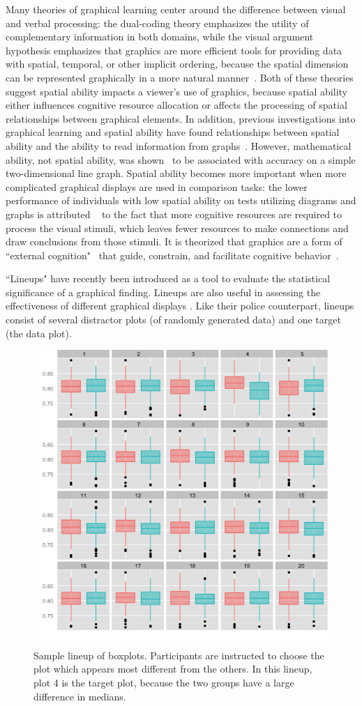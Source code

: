 \documentclass[11pt]{isuthesis}\usepackage[]{graphicx}\usepackage[]{color}
\begin{document}
Many theories of graphical learning center around the difference between visual and verbal processing: the dual-coding theory emphasizes the utility of complementary information in both domains, while the visual argument hypothesis emphasizes that graphics are more efficient tools for providing data with spatial, temporal, or other implicit ordering, because the spatial dimension can be represented graphically in a more natural manner~\citep{vekiri2002value}. Both of these theories suggest spatial ability impacts a viewer's use of graphics, because spatial ability either influences cognitive resource allocation or affects the processing of spatial relationships between graphical elements. In addition, previous investigations into graphical learning and spatial ability have found relationships between spatial ability and the ability to read information from graphs~\citep{lowrie2007solving}. 
However,  mathematical ability, not spatial ability, was shown~\citep{shah1995conceptual} to be associated with accuracy on a simple two-dimensional line graph. 
Spatial ability becomes more important when more complicated graphical displays are used in comparison tasks: the lower performance of individuals with low spatial ability on tests utilizing diagrams and graphs is attributed ~\citep{mayer1994whom} to the fact that more cognitive resources are required to process the visual stimuli, which leaves fewer resources to make connections and draw conclusions from those stimuli. It is theorized that graphics are a form of ``external cognition"~\citep{scaife1996external} that guide, constrain, and facilitate cognitive behavior~\citep{zhang1997nature}. 

``Lineups" have recently been introduced \citep{buja2009statistical, wickham2010graphical, majumder2013validation} as a tool to evaluate the statistical significance of a graphical finding. Lineups are also useful in assessing the effectiveness of different graphical displays \citep{hofmann2012graphical, loy:2015}. Like their police counterpart, lineups consist of several distractor plots (of randomly generated data) and one target (the data plot). 

\begin{figure}[htp]
\centering
\includegraphics[width=.5\linewidth]{lineup}
\caption[Sample lineup]{Sample lineup of boxplots. Participants are instructed to choose the plot which appears most different from the others. In this lineup, plot 4 is the target plot, because the two groups have a large difference in medians.\label{fig:lineup}}
\end{figure}
\end{document}
